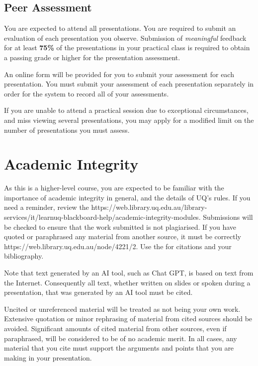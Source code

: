 \documentclass{csse4400}
\begin{document}
\subsection{Peer Assessment}
You are expected to attend all presentations.
You are required to submit an evaluation of each presentation you observe.
Submission of \emph{meaningful} feedback for at least \textbf{75\%} of the presentations in your practical class
is required to obtain a passing grade or higher for the presentation assessment.

An online form will be provided for you to submit your assessment for each presentation.
You must submit your assessment of each presentation separately in order for the system to record all of your assessments.

If you are unable to attend a practical session due to exceptional circumstances,
and miss viewing several presentations,
you may apply for a modified limit on the number of presentations you must assess.


\section{Academic Integrity}
As this is a higher-level course, you are expected to be familiar with the importance of academic integrity in general,
and the details of UQ's rules.
If you need a reminder, review the 
{https://web.library.uq.edu.au/library-services/it/learnuq-blackboard-help/academic-integrity-modules}.
Submissions will be checked to ensure that the work submitted is not plagiarised.
If you have quoted or paraphrased any material from another source, it must be correctly 
{https://web.library.uq.edu.au/node/4221/2}.
Use the  for citations and your bibliography.

Note that text generated by an AI tool, such as Chat GPT, is based on text from the Internet.
Consequently all text, whether written on slides or spoken during a presentation,
that was generated by an AI tool must be cited.

Uncited or unreferenced material will be treated as not being your own work.
Extensive quotation or minor rephrasing of material from cited sources should be avoided.
Significant amounts of cited material from other sources, even if paraphrased, will be considered to be of no academic merit.
In all cases, any material that you cite must support the arguments and points that you are making in your presentation.
\end{document}
